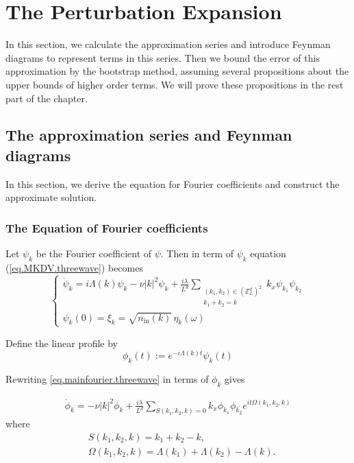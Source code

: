 \section{The Perturbation Expansion}
In this section, we calculate the approximation series and introduce Feynman diagrams to represent terms in this series. Then we bound the error of this approximation by the bootstrap method, assuming several propositions about the upper bounds of higher order terms. We will prove these propositions in the rest part of the chapter.


\subsection{The approximation series and Feynman diagrams}\label{sec.appFey} In this section, we derive the equation for Fourier coefficients and construct the approximate solution. 

\subsubsection{The Equation of Fourier coefficients}

Let $\psi_k$ be the Fourier coefficient of $\psi$. Then in term of $\psi_k$ equation (\ref{eq.MKDV.threewave}) becomes
\begin{equation}\label{eq.mainfourier.threewave}
\begin{cases}
 \dot{\psi}_{k} =  i\Lambda(k) \psi_k -\nu |k|^2 \psi_k
 +\frac{i\lambda}{L^{d}} \sum\limits_{\substack{(k_1,k_2) \in (\mathbb{Z}^d_L)^2 \\ k_1 + k_2 = k}} k_{x}\psi_{k_1} \psi_{k_2}  \\[2em]
\psi_k(0) = \xi_k = \sqrt{n_{\textrm{in}}(k)} \, \eta_{k}(\omega)
\end{cases}
\end{equation}

Define the linear profile by
\begin{equation}
\phi_k(t):= e^{-i\Lambda(k) t}  \psi_k(t)    
\end{equation}

Rewriting \eqref{eq.mainfourier.threewave} in terms of $\phi_k$ gives  

\begin{equation}\label{eq.mainlinearprofile.threewave}
\begin{split}
\dot{\phi}_{k} 
= -\nu |k|^2 \phi_k + \frac{i\lambda}{L^{d}} \sum\limits_{S(k_1,k_2,k)=0}k_{x}\phi_{k_1} \phi_{k_2}e^{i t\Omega(k_1,k_2,k)}
\end{split}
\end{equation}
where
\begin{equation}
\begin{split}
    &S(k_1,k_2,k) = k_1 + k_2 - k,
    \\
    &\Omega(k_1,k_2,k) =\Lambda(k_1)+\Lambda(k_2)-\Lambda(k).
\end{split}
\end{equation}

